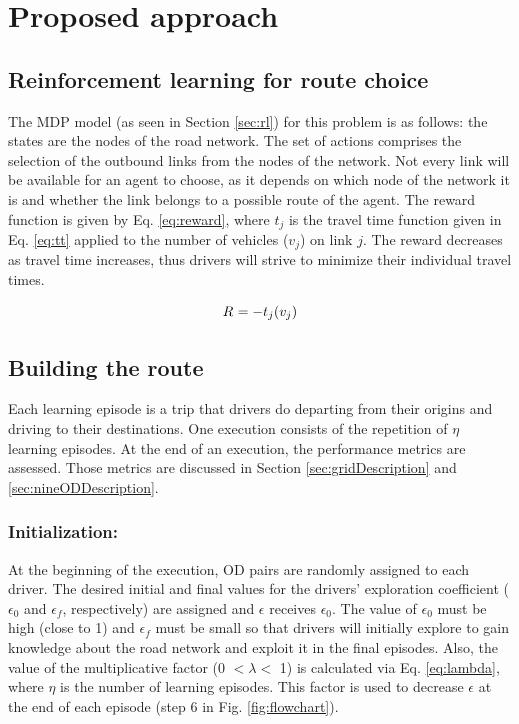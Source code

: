 \documentclass{RITA}
\newcommand{\travTime}{\ensuremath{t_j}} 	%
\newcommand{\veh}{\ensuremath{v}}		%
\newcommand{\reward}[1][]{\ensuremath{R_#1}}	%
\newcommand{\numepis}{\ensuremath{\eta}}	%
\begin{document}
\section{Proposed approach}
\label{sec:proposal}

\subsection{Reinforcement learning for route choice}

The MDP model (as seen in Section \ref{sec:rl}) for this problem is as follows: the states are the nodes of the  road network. The set of actions comprises the selection of the outbound links from the nodes of the network. Not every link will be available for an agent to choose, as it depends on which node of the network it is and whether the link belongs to a possible route of the agent. The reward function is given by Eq. \eqref{eq:reward}, where $\travTime$ is the travel time function given in Eq. \eqref{eq:tt} applied to the number of vehicles ($\veh_j$) on link $j$. The reward decreases as travel time increases, thus drivers will strive to minimize their individual travel times.

\begin{equation}
\label{eq:reward}
\reward{} = - \travTime(\veh_j)
\end{equation}

\subsection{Building the route}

Each learning episode is a trip that drivers do departing from their origins and driving to their destinations. One execution consists of the repetition of $\numepis$ learning episodes. At the end of an execution, the performance metrics are assessed. Those metrics are discussed in Section \ref{sec:gridDescription} and \ref{sec:nineODDescription}.

\subsubsection{Initialization:}
At the beginning of the execution, OD pairs are randomly assigned to each driver. The desired initial and final values for the drivers' exploration coefficient ($\epsilon_0$ and $\epsilon_f$, respectively) are assigned and $\epsilon$ receives $\epsilon_0$. The value of $\epsilon_0$ must be high (close to 1) and $\epsilon_f$ must be small so that drivers will initially explore to gain knowledge about the road network and exploit it in the final episodes. Also, the value of the multiplicative factor (0 $< \lambda <$ 1) is calculated via Eq. \eqref{eq:lambda}, where $\numepis$ is the number of learning episodes. This factor is used to decrease $\epsilon$ at the end of each episode (step 6 in Fig. \ref{fig:flowchart}).
\end{document}
